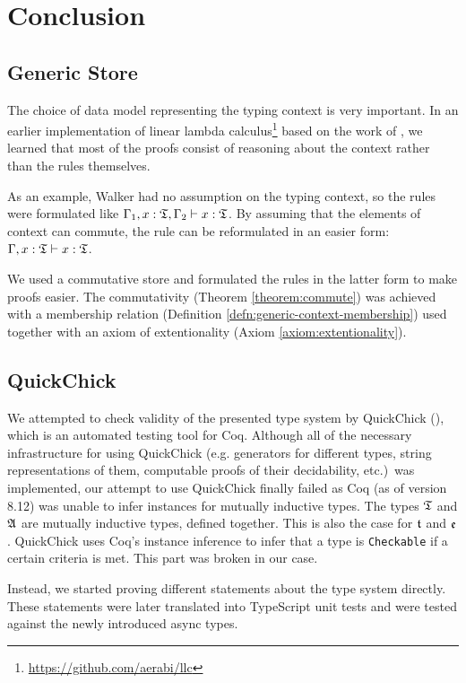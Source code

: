 \chapter{Conclusion}\label{chap:conclusion}

\section{Generic Store}

The choice of data model representing the typing context is very important. In an earlier implementation of linear lambda calculus\footnote{\url{https://github.com/aerabi/llc}} based on the work of \cite{DavidWalker2004}, we learned that most of the proofs consist of reasoning about the context rather than the rules themselves.

As an example, Walker had no assumption on the typing context, so the rules were formulated like $\Gamma_1, x : \mathfrak{T}, \Gamma_2 \vdash x : \mathfrak{T}$. By assuming that the elements of context can commute, the rule can be reformulated in an easier form: $\Gamma, x : \mathfrak{T} \vdash x : \mathfrak{T}$.

We used a commutative store and formulated the rules in the latter form to make proofs easier. The commutativity (Theorem \ref{theorem:commute}) was achieved with a membership relation (Definition \ref{defn:generic-context-membership}) used together with an axiom of extentionality (Axiom \ref{axiom:extentionality}).

\section{QuickChick}

We attempted to check validity of the presented type system by QuickChick (\cite{DBLP:conf/itp/Paraskevopoulou15}), which is an automated testing tool for Coq. Although all of the necessary infrastructure for using QuickChick (e.g. generators for different types, string representations of them, computable proofs of their decidability, etc.)~was implemented, our attempt to use QuickChick finally failed as Coq (as of version 8.12) was unable to infer instances for mutually inductive types. The types $\mathfrak{T}$ and $\mathfrak{A}$ are mutually inductive types, defined together. This is also the case for $\mathfrak{t}$ and $\mathfrak{e}$. QuickChick uses Coq's instance inference to infer that a type is \texttt{Checkable} if a certain criteria is met. This part was broken in our case.

Instead, we started proving different statements about the type system directly. These statements were later translated into TypeScript unit tests and were tested against the newly introduced async types.

